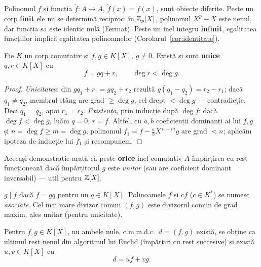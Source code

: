\begin{observatie}\label{obs:functie}
Polinomul $f$ și funcția $\tilde f:A\to A$, $\tilde f(x)=f(x)$, sunt obiecte diferite. Peste un corp \textbf{finit} ele nu se determină reciproc: în $\mathbb{Z}_p[X]$, polinomul $X^p-X$ este nenul, dar funcția sa este identic nulă (Fermat). Peste un inel integru \textbf{infinit}, egalitatea funcțiilor implică egalitatea polinoamelor (Corolarul~\ref{cor:identitate}).
\end{observatie}

\begin{teorema}\label{teo:impartire}
Fie $K$ un corp comutativ și $f,g\in K[X]$, $g\neq0$. Există și sunt \textbf{unice} $q,r\in K[X]$ cu
\[
f=gq+r,\qquad \deg r<\deg g.
\]
\end{teorema}

\begin{proof}
\emph{Unicitatea}: din $gq_1+r_1=gq_2+r_2$ rezultă $g(q_1-q_2)=r_2-r_1$; dacă $q_1\neq q_2$, membrul stâng are grad $\ge\deg g$, cel drept $<\deg g$ --- contradicție. Deci $q_1=q_2$, apoi $r_1=r_2$.
\emph{Existența}, prin inducție după $\deg f$: dacă $\deg f<\deg g$, luăm $q=0$, $r=f$. Altfel, cu $a,b$ coeficienții dominanți ai lui $f,g$ și $n=\deg f\ge m=\deg g$, polinomul $f_1=f-\frac ab X^{\,n-m} g$ are grad $<n$; aplicăm ipoteza de inducție lui $f_1$ și recompunem.
\end{proof}

\begin{observatie}
Aceeași demonstrație arată că peste \textbf{orice} inel comutativ $A$ împărțirea cu rest funcționează dacă împărțitorul $g$ este \emph{unitar} (sau are coeficient dominant inversabil) --- util pentru $\mathbb{Z}[X]$.
\end{observatie}

\begin{definitie}
$g\mid f$ dacă $f=gq$ pentru un $q\in K[X]$. Polinoamele $f$ și $cf$ ($c\in K^*$) se numesc \emph{asociate}. Cel mai mare divizor comun $(f,g)$ este divizorul comun de grad maxim, ales unitar (pentru unicitate).
\end{definitie}

\begin{teorema}\label{teo:bezout}
Pentru $f,g\in K[X]$, nu ambele nule, c.m.m.d.c.\ $d=(f,g)$ există, se obține ca ultimul rest nenul din algoritmul lui Euclid (împărțiri cu rest succesive) și există $u,v\in K[X]$ cu
\[
d=uf+vg.
\]
\end{teorema}

